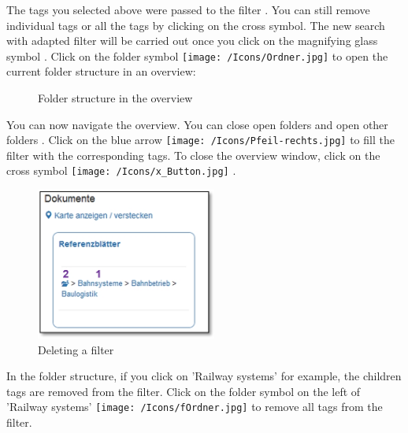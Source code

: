 The tags you selected above were passed to the filter . You can still remove individual tags or all the tags by clicking on the cross symbol. The new search with adapted filter will be carried out once you click on the magnifying glass symbol . Click on the folder symbol \texttt{[image: /Icons/Ordner.jpg]}  to open the current folder structure in an overview: 

\begin{figure}[H]
\caption{Folder structure in the overview}
\end{figure}

You can now navigate the overview. You can close open folders  and open other folders . Click on the blue arrow \texttt{[image: /Icons/Pfeil-rechts.jpg]}  to fill the filter with the corresponding tags. To close the overview window, click on the cross symbol \texttt{[image: /Icons/x\_Button.jpg]} .


\pagebreak

\begin{figure}   %
  \vspace{-30pt}      %
  \begin{center}
    \includegraphics[height=50mm]{../chapters/11_Dokumentenablage/pictures/11-htag_FilterLoeschen.jpg}
  \end{center}
  \vspace{-20pt}
  \caption{Deleting a filter}
  \vspace{-10pt}
\end{figure}
In the folder structure, if you click on 'Railway systems'  for example, the children tags are removed from the filter. Click on the folder symbol on the left of 'Railway systems' \texttt{[image: /Icons/fOrdner.jpg]}  to remove all tags from the filter.

